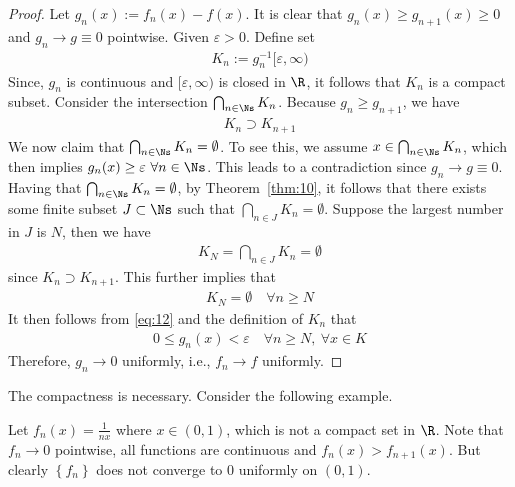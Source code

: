 \documentclass[thmcnt=section, 12pt]{elegantbook}
\begin{document}
\begin{proof}
    Let $g_n(x) := f_n(x) - f(x)$. It is clear that $g_n(x) \geq g_{n+1}(x) \geq 0$ and $g_n \to g \equiv 0$ pointwise. Given $\varepsilon > 0$. Define set
    \begin{align*}
        K_n := g_n^{-1}[\varepsilon, \infty)
    \end{align*}
    Since, $g_n$ is continuous and $[\varepsilon, \infty)$ is closed in $\R$, it follows that $K_n$ is a compact subset. Consider the intersection $\bigcap_{n \in \Ns} K_n$. Because $g_n \geq g_{n+1}$, we have
    \begin{align*}
        K_{n} \supset K_{n+1}
    \end{align*}
    We now claim that $\bigcap_{n \in \Ns} K_n = \emptyset$. To see this, we assume $x \in \bigcap_{n \in \Ns} K_n$, which then implies $g_n(x) \geq \varepsilon \ \forall n \in \Ns$. This leads to a contradiction since $g_n \to g \equiv 0$. Having that $\bigcap_{n \in \Ns} K_n = \emptyset$, by Theorem~\ref{thm:10}, it follows that there exists some finite subset $J \subset \Ns$ such that $\bigcap_{n \in J} K_n = \emptyset$. Suppose the largest number in $J$ is $N$, then we have
    \begin{align*}
        K_N = \bigcap_{n \in J} K_n = \emptyset 
    \end{align*}
    since $K_n \supset K_{n+1}$. This further implies that
    \begin{align}
        K_N = \emptyset \quad \forall n \geq N
        \label{eq:12}
    \end{align}
    It then follows from \eqref{eq:12} and the definition of $K_n$ that 
    \begin{align*}
        0 \leq g_n(x) < \varepsilon \quad \forall n \geq N, \ \forall x \in K
    \end{align*}
    Therefore, $g_n \to 0$ uniformly, i.e., $f_n \to f$ uniformly.
\end{proof}

\par The compactness is necessary. Consider the following example.

\begin{example}
    Let $f_n(x) = \frac{1}{nx}$ where $x \in (0,1)$, which is not a compact set in $\R$. Note that $f_n \to 0$ pointwise, all functions are continuous and $f_n(x) > f_{n+1}(x)$. But clearly $\left\{f_n\right\}$ does not converge to $0$ uniformly on $(0,1)$.
\end{example}
\end{document}
